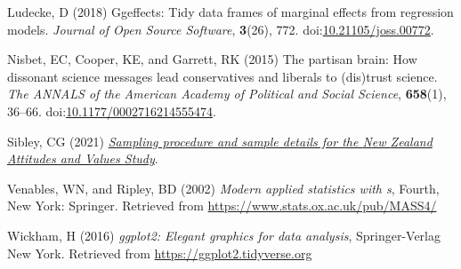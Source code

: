 \documentclass[
  single column]{article}
\newlength{\cslhangindent}
\newenvironment{CSLReferences}[2] %
 {\begin{list}{}{%
  \setlength{\itemindent}{0pt}
  \setlength{\leftmargin}{0pt}
  \setlength{\parsep}{0pt}
  \ifodd #1
   \setlength{\leftmargin}{\cslhangindent}
   \setlength{\itemindent}{-1\cslhangindent}
  \fi
  \setlength{\itemsep}{#2\baselineskip}}}
 {\end{list}}
\begin{document}
\begin{CSLReferences}{1}{0}
Ludecke, D (2018) Ggeffects: Tidy data frames of marginal effects from
regression models. \emph{Journal of Open Source Software},
\textbf{3}(26), 772.
doi:\href{https://doi.org/10.21105/joss.00772}{10.21105/joss.00772}.

Nisbet, EC, Cooper, KE, and Garrett, RK (2015) The partisan brain: How
dissonant science messages lead conservatives and liberals to (dis)trust
science. \emph{The ANNALS of the American Academy of Political and
Social Science}, \textbf{658}(1), 36--66.
doi:\href{https://doi.org/10.1177/0002716214555474}{10.1177/0002716214555474}.

Sibley, CG (2021)
\emph{\href{https://doi.org/10.31234/osf.io/wgqvy}{Sampling procedure
and sample details for the {N}ew {Z}ealand {A}ttitudes and {V}alues
{S}tudy}}.

Venables, WN, and Ripley, BD (2002) \emph{Modern applied statistics with
s}, Fourth, New York: Springer. Retrieved from
\url{https://www.stats.ox.ac.uk/pub/MASS4/}

Wickham, H (2016) \emph{ggplot2: Elegant graphics for data analysis},
Springer-Verlag New York. Retrieved from
\url{https://ggplot2.tidyverse.org}

\end{CSLReferences}
\end{document}
